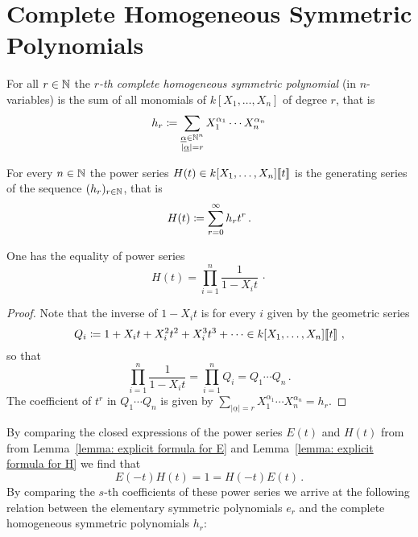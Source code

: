 \section{Complete Homogeneous Symmetric Polynomials}


\begin{definition}
  For all $r \in \mathbb{N}$ the \emph{$r$-th complete homogeneous symmetric polynomial} (in $n$-variables) is the sum of all monomials of $k[X_1, \dotsc, X_n]$ of degree $r$, that is
  \[
              h_r
    \coloneqq  \sum_{\substack{\underline{\alpha} \in \mathbb{N}^n \\ |\underline{\alpha}| = r}}
              X_1^{\alpha_1} \dotsm X_n^{\alpha_n}
  \]
\end{definition}


\begin{definition}
  For every $n \in \mathbb{N}$ the power series $H(t) \in k[X_1, \dotsc, X_n]\!\left[\!\left[t\right]\!\right]$ is the generating series of the sequence $(h_r)_{r \in \mathbb{N}}$, that is
  \[
              H(t)
    \coloneqq  \sum_{r=0}^\infty h_r t^r \,.
  \]
\end{definition}


\begin{lemma}
  \label{lemma: explicit formula for H}
  One has the equality of power series
  \[
      H(t)
    = \prod_{i=1}^n \frac{1}{1 - X_i t} \,\cdotp
  \]
\end{lemma}


\begin{proof}
  Note that the inverse of $1 - X_i t$ is for every $i$ given by the geometric series
  \[
              Q_i
    \coloneqq  1 + X_i t + X_i^2 t^2 + X_i^3 t^3 + \dotsb
    \in       k[X_1, \dotsc, X_n]\!\left[\!\left[t\right]\!\right] \,,
  \]
  so that
  \[
      \prod_{i=1}^n \frac{1}{1 - X_i t}
    = \prod_{i=1}^n Q_i
    = Q_1 \dotsb Q_n \,.
  \]
  The coefficient of $t^r$ in $Q_1 \dotsm Q_n$ is given by $\sum_{|\underline{\alpha}| = r}  X_1^{\alpha_1} \dotsm X_n^{\alpha_n} = h_r$.
\end{proof}


\begin{fluff}
  By comparing the closed expressions of the power series $E(t)$ and $H(t)$ from from Lemma~\ref{lemma: explicit formula for E} and Lemma~\ref{lemma: explicit formula for H} we find that
  \[
      E(-t)H(t)
    = 1
    = H(-t)E(t) \,.
  \]
  By comparing the $s$-th coefficients of these power series we arrive at the following relation between the elementary symmetric polynomials $e_r$ and the complete homogeneous symmetric polynomials $h_r$:
\end{fluff}


